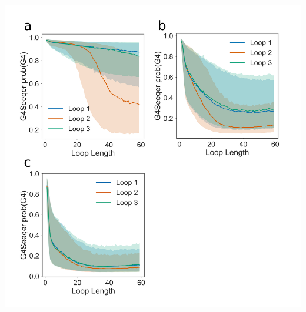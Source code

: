 \documentclass[12pt,a4paper,]{report}
\let\origfigure=\figure
\let\endorigfigure=\endfigure
\renewenvironment{figure}[1][2] {
    \expandafter\origfigure\expandafter[H]
} {
    \endorigfigure
}
\begin{document}
\begin{figure}[htbp]
\centering
\includegraphics[width=\textwidth,height=562pt,keepaspectratio]{chapter_3/figures/loop_length.png}
\caption[Effect of increasing loop length on G4Seeqer score]{\textbf{Effect   of   increasing   loop   length   on   G4Seeqer   score}   \textbf{a)}   Effect   of   loop   length   on   predicted   G4   stability   when   other   loops   are   held   at   a   constant   length   of   \textbf{a)}   1bp,   \textbf{b)}   2bp   or   \textbf{c)}   3bp.   Median   value   and   68\%   confidence   intervals   are   produced   using   5000   randomly   generated   sequences   (including   flanking   regions   and   loop   contents)   for   each   pattern   analysed.   \label{loop_len}}
\end{figure}
\end{document}
